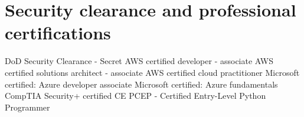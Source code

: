\section{Security clearance and professional certifications}
{%
}
{%
	DoD Security Clearance - Secret}
{}
{%
}
{%
	AWS certified developer - associate}
{}
{%
}
{%
	AWS certified solutions architect - associate}
{}
{%
}
{%
	AWS certified cloud practitioner}
{}
{%
}
{%
	Microsoft certified: Azure developer associate}
{}
{%
}
{%
	Microsoft certified: Azure fundamentals}
{}
{%
}
{%
	CompTIA Security+ certified CE}
{}
{%
}
{%
	PCEP - Certified Entry-Level Python Programmer}
{}
